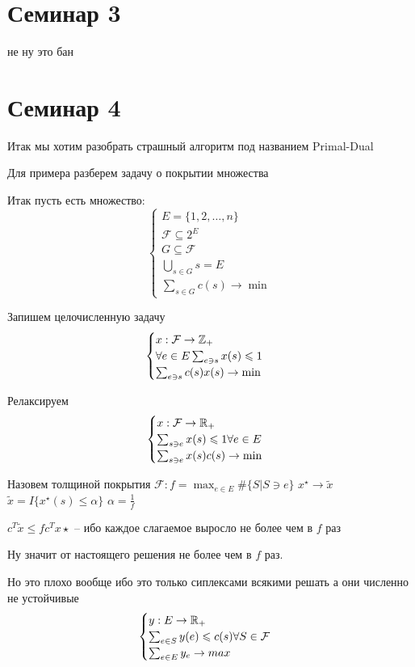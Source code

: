 \section*{Семинар 3}
не ну это бан
\section*{Семинар 4}
Итак мы хотим разобрать страшный алгоритм под названием Primal-Dual

Для примера разберем задачу о покрытии множества

Итак пусть есть множество: 
\[
	\begin{cases}
		E = \{1, 2, \ldots, n\}\\
		\mathcal{F} \subseteq 2^E\\
		G \subseteq \mathcal{F}\\
		\bigcup_{s \in G} s = E\\
		\sum_{s \in G} c(s) \to \min
	\end{cases}
\]

Запишем целочисленную задачу
\[
	\begin{cases}
		x: \mathcal{F} \to \mathbb{Z}_+\\
		\forall e \in E \sum_{e \ni s} x(s) \leqslant 1\\
		\sum_{e \ni s} c(s) x(s) \to \min
	\end{cases}
\]

Релаксируем
\[
	\begin{cases}
		x: \mathcal{F} \to \mathbb{R}_+\\
		\sum_{s \ni e} x(s) \leqslant 1 \forall e \in E\\
		\sum_{s \ni e} x(s) c(s) \to \min
	\end{cases}
\]

 Назовем толщиной покрытия $\mathcal{F}: f = \max_{e \in E} \#\{S | S \ni e\}$
 $x^\star \to \tilde{x}$
 $\tilde{x} = I\{x^\star (s) \leq \alpha\}$
 $\alpha = \frac1f$

 $c^T \tilde x \leq f c^T x \star$ -- ибо каждое слагаемое выросло не более чем в $f$ раз

 Ну значит от настоящего решения не более чем в $f$ раз.

 Но это плохо вообще ибо это только сиплексами всякими решать а они численно не устойчивые
 \[
 	\begin{cases}
 		y: E \to \mathbb{R}_+\\
 		\sum_{e \in S} y(e) \leqslant c(s)  \forall S \in \mathcal{F}\\
 		\sum_{e \in E} y_e \to max
 	\end{cases}
 \]

